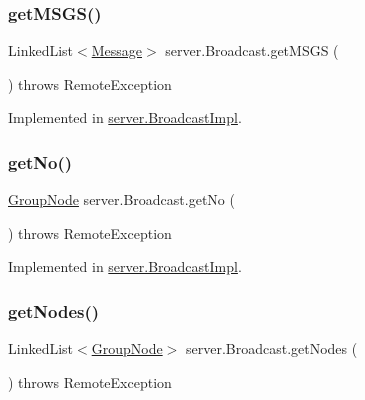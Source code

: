 \subsubsection{\texorpdfstring{get\+M\+S\+G\+S()}{getMSGS()}}
{\footnotesize\ttfamily Linked\+List$<$\hyperlink{classstructure_1_1_message}{Message}$>$ server.\+Broadcast.\+get\+M\+S\+GS (\begin{DoxyParamCaption}{ }\end{DoxyParamCaption}) throws Remote\+Exception}



Implemented in \hyperlink{classserver_1_1_broadcast_impl_aecb6cd49880c2e908b1ba3d17c454ced}{server.\+Broadcast\+Impl}.

\mbox{\label{interfaceserver_1_1_broadcast_a16bd97cd54313805b23cb7e2255a66a6}} 
\subsubsection{\texorpdfstring{get\+No()}{getNo()}}
{\footnotesize\ttfamily \hyperlink{classstructure_1_1_group_node}{Group\+Node} server.\+Broadcast.\+get\+No (\begin{DoxyParamCaption}{ }\end{DoxyParamCaption}) throws Remote\+Exception}



Implemented in \hyperlink{classserver_1_1_broadcast_impl_a7e004ba2fd22f9225c278f1b5bbe4dbb}{server.\+Broadcast\+Impl}.

\mbox{\label{interfaceserver_1_1_broadcast_af8619fab19094de9cbc3e0b4d34eca7e}} 
\subsubsection{\texorpdfstring{get\+Nodes()}{getNodes()}}
{\footnotesize\ttfamily Linked\+List$<$\hyperlink{classstructure_1_1_group_node}{Group\+Node}$>$ server.\+Broadcast.\+get\+Nodes (\begin{DoxyParamCaption}{ }\end{DoxyParamCaption}) throws Remote\+Exception}



